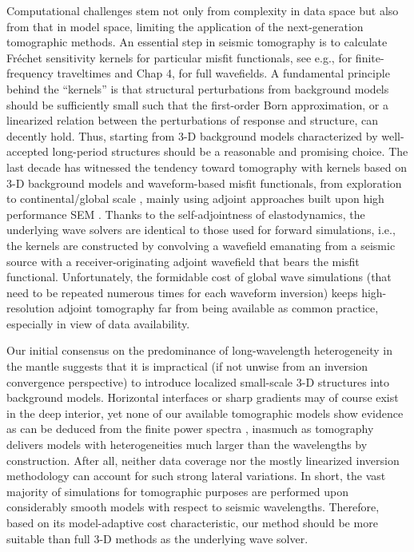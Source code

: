 \documentclass[extra,referee]{gji}
\begin{document}
Computational challenges stem not only from complexity in data space 
but also from that in model space, limiting the application 
of the next-generation tomographic methods.
An essential step in seismic tomography is to calculate  
Fr\'{e}chet sensitivity kernels
for particular misfit functionals, see e.g., \cite{dahlen2000frechet}
for finite-frequency traveltimes and Chap 4, \cite{nolet2008breviary}
for full wavefields. 
A fundamental principle behind the ``kernels'' is that 
structural perturbations from background models
should be sufficiently small such that the first-order
Born approximation, or a linearized relation between the perturbations of 
response and structure, can decently hold. 
Thus, starting from 3-D background models characterized by well-accepted 
long-period structures should be a reasonable and promising choice.
The last decade has witnessed the tendency toward  
tomography with kernels based on 3-D background models and waveform-based misfit
functionals, from exploration 
\cite[e.g.,][]{plessix2006review, luo2009seismic}
to continental/global scale
\cite[e.g.,][]{liu2008finite, tape2009adjoint, fichtner2008theoretical, colombi2014seismic}, 
mainly using adjoint approaches \cite[]{tarantola1988theoretical,
tromp2005seismic} built upon high performance 
SEM \cite[]{komatitsch2002spectralI, peter2011forward}.
Thanks to the self-adjointness of elastodynamics, the underlying wave solvers are
identical to those used for forward simulations, i.e., the kernels are 
constructed by convolving a wavefield emanating from a seismic source with a
receiver-originating adjoint wavefield that bears the misfit functional.
Unfortunately, the formidable cost of global wave simulations
(that need to be repeated numerous times for each waveform inversion) 
keeps high-resolution adjoint tomography far from being 
available as common practice, especially in view of data availability.

Our initial consensus on the predominance of long-wavelength 
heterogeneity in the mantle \cite[]{su1991predominance} suggests that
it is impractical (if not unwise from an inversion convergence
perspective) to introduce localized small-scale 3-D structures
into background models. 
Horizontal interfaces or sharp gradients may of course exist in the deep interior, 
yet none of our available tomographic models show evidence as can be 
deduced from the finite power spectra \cite[]{becker2002comparison},
inasmuch as tomography delivers models with heterogeneities much larger than the
wavelengths by construction.
After all, neither data coverage nor the mostly linearized inversion 
methodology can account for such strong lateral variations.
In short, the vast majority of simulations for tomographic purposes are
performed upon considerably smooth models with respect to seismic 
wavelengths. Therefore, based on its model-adaptive cost characteristic, 
our method should be more suitable than full 3-D methods 
as the underlying wave solver.   
\end{document}
